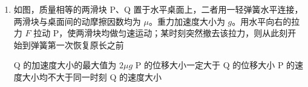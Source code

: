 \documentclass[\gkver]{gaokaozhenti}
\begin{document}
\begin{enumerate}
{BD．运动的过程中在电场力对带电粒子做功，粒子速度大小发生变化，粒子所受的洛伦兹力方向始终与速度方向垂直。由于匀强电场方向是沿 $y$ 轴正方向，故 $x$ 轴为匀强电场的等势面，从开始到带电粒子偏转再次运动到 $x$ 轴时，电场力做功为 0，洛伦兹力不做功，故带电粒子再次回到 $x$ 轴时的速度为 0，随后受电场力作用再次进入第二象限重复向左偏转，故 B 正确，D 错误。

故选 B。

解法二：

粒子在 $O$ 点静止，对速度进行分解，分解为向 $x$ 轴正方向的速度 $v$，向 $x$ 轴负方向的速度 $v'$，两个速度大小相等，方向相反。使得其中一个洛伦兹力平衡电场力，即 $qBv'=qE$

则粒子在电场、磁场中的运动，可视为，向 $x$ 轴负方向以速度 $v'=\frac{E}{B}$ 做匀速直线运动，同时在 $x$ 轴上方做匀速圆周运动。

故选 B。
}

\item
如图，质量相等的两滑块 P、Q 置于水平桌面上，二者用一轻弹簧水平连接，两滑块与桌面间的动摩擦因数均为 $\mu$。重力加速度大小为 $g$。用水平向右的拉力 $F$ 拉动 P，使两滑块均做匀速运动；某时刻突然撤去该拉力，则从此刻开始到弹簧第一次恢复原长之前


{Q 的加速度大小的最大值为 $2\mu g$}
{P 的位移大小一定大于 Q 的位移大小}
{P 的速度大小均不大于同一时刻 Q 的速度大小}

\end{enumerate}
\end{document}
